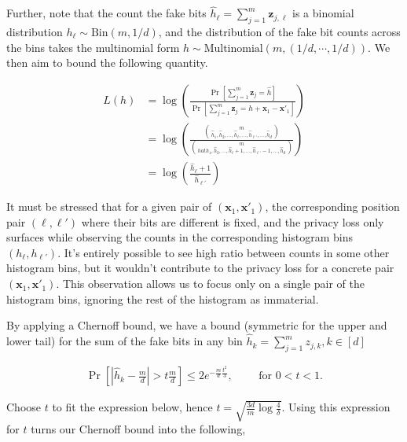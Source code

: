 \documentclass[11pt]{article}
\newcommand{\bbx}{\pmb{x}}
\newcommand{\bbz}{\pmb{z}}
\begin{document}
Further, note that the count the fake bits $\hat{h}_\ell = \sum^m_{j=1} \bbz_{j,\ell}$ is a binomial distribution $h_\ell \sim \text{Bin}(m, 1/d)$, and the distribution of the fake bit counts across the bins takes the multinomial form $ \hat{h} \sim \text{Multinomial}(m,(1/d,\cdots, 1/d))$. We then aim to bound the following quantity.

\begin{align*}
 L(h) &= \log \left ( \frac{\Pr[\sum^m_{j=1} \bbz_j = \hat{h} ]}{\Pr[ \sum^m_{j=1} \bbz_j = \hat{h} + \bbx_1 - \bbx'_1]} \right ) \\
 & = \log  \left ( \frac{ {m \choose \hat{h}_1, \hat{h}_2, \dots , \hat{h}_\ell, \dots, \hat{h}_{\ell'}, \dots, \hat{h}_d}}{ { m \choose hat{h}_1, \hat{h}_2, \dots , \hat{h}_\ell + 1, \dots, \hat{h}_{\ell'} - 1, \dots, \hat{h}_d}} \right ) \\
 & = \log  \left ( \frac{\hat{h}_\ell + 1}{\hat{h}_{\ell'}} \right ) 
\end{align*}

It must be stressed that for a given pair of $(\bbx_1, \bbx'_1)$, the corresponding position pair $(\ell,\ell')$ where their bits are different is fixed, and the privacy loss only surfaces while observing the counts in the corresponding histogram bins $(h_\ell, h_{\ell'})$.  It's entirely possible to see high ratio between counts in some other histogram bins, but it wouldn't contribute to the privacy loss for a concrete pair $(\bbx_1, \bbx'_1)$.  This observation allows us to focus only on a single pair of the histogram bins, ignoring the rest of the histogram as immaterial.  

By applying a Chernoff bound, we have a bound (symmetric for the upper and lower tail) for the sum of the fake bits in any bin $\hat{h}_k = \sum^m_{j=1} z_{j,k},  k \in [d]$

\begin{align*}
 \Pr \left [ \left | \hat{h}_k - \frac{m}{d} \right | > t \frac{m}{d} \right ]  \le 2 e^{- \frac{m}{d} \frac{t^2}{3}}, \qquad \text{ for  } 0 < t < 1.
\end{align*}

Choose $t$ to fit the expression below, hence $t = \sqrt{  \frac{3d}{m} \log{\frac{4}{\delta}} }$.
Using this expression for $t$ turns our Chernoff bound into the following,
 
\end{document}
